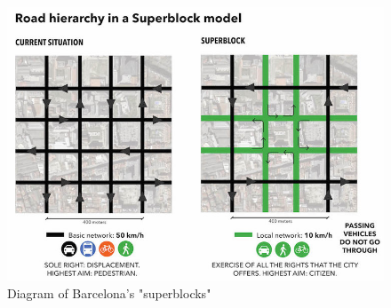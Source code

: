 \documentclass[12pt]{article}                         %
\begin{document}
\begin{figure}[h]
    \centering
    \includegraphics[scale=4.5]{barcelona_superblock.jpg}
    \caption{Diagram of Barcelona's "superblocks"}
    \label{img:barcelona_superblock}
\end{figure}
\end{document}
